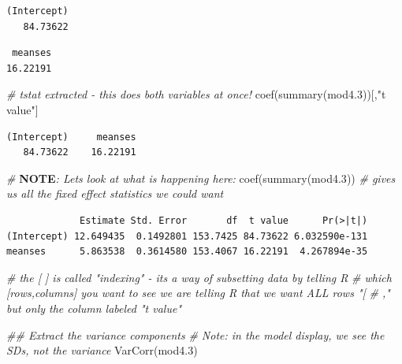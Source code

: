 \documentclass[
  letterpaper,
  DIV=11,
  numbers=noendperiod]{scrreprt}
\newenvironment{Shaded}{\begin{snugshade}}{\end{snugshade}}
\newcommand{\AlertTok}[1]{\textcolor[rgb]{1.00,0.00,0.00}{\textbf{#1}}}
\newcommand{\CommentTok}[1]{\textcolor[rgb]{0.38,0.63,0.69}{\textit{#1}}}
\newcommand{\DecValTok}[1]{\textcolor[rgb]{0.25,0.63,0.44}{#1}}
\newcommand{\DocumentationTok}[1]{\textcolor[rgb]{0.73,0.13,0.13}{\textit{#1}}}
\newcommand{\FloatTok}[1]{\textcolor[rgb]{0.25,0.63,0.44}{#1}}
\newcommand{\FunctionTok}[1]{\textcolor[rgb]{0.02,0.16,0.49}{#1}}
\newcommand{\NormalTok}[1]{\textcolor[rgb]{0.00,0.44,0.13}{#1}}
\newcommand{\SpecialCharTok}[1]{\textcolor[rgb]{0.25,0.44,0.63}{#1}}
\newcommand{\StringTok}[1]{\textcolor[rgb]{0.25,0.44,0.63}{#1}}
\begin{document}
\begin{verbatim}
(Intercept) 
   84.73622 
\end{verbatim}

\begin{Shaded}
\end{Shaded}

\begin{verbatim}
 meanses 
16.22191 
\end{verbatim}

\begin{Shaded}
\begin{Highlighting}[]
\CommentTok{\# tstat extracted {-} this does both variables at once! }
\FunctionTok{coef}\NormalTok{(}\FunctionTok{summary}\NormalTok{(mod4}\FloatTok{.3}\NormalTok{))[,}\StringTok{"t value"}\NormalTok{]}
\end{Highlighting}
\end{Shaded}

\begin{verbatim}
(Intercept)     meanses 
   84.73622    16.22191 
\end{verbatim}

\begin{Shaded}
\begin{Highlighting}[]
\CommentTok{\# }\AlertTok{NOTE}\CommentTok{: Let\textquotesingle{}s look at what is happening here:}
\FunctionTok{coef}\NormalTok{(}\FunctionTok{summary}\NormalTok{(mod4}\FloatTok{.3}\NormalTok{)) }\CommentTok{\# gives us all the fixed effect statistics we could want}
\end{Highlighting}
\end{Shaded}

\begin{verbatim}
             Estimate Std. Error       df  t value      Pr(>|t|)
(Intercept) 12.649435  0.1492801 153.7425 84.73622 6.032590e-131
meanses      5.863538  0.3614580 153.4067 16.22191  4.267894e-35
\end{verbatim}

\begin{Shaded}
\begin{Highlighting}[]
\CommentTok{\# the [ ] is called "indexing" {-} it\textquotesingle{}s a way of subsetting data by telling R}
\CommentTok{\# which [rows,columns] you want to see we are telling R that we want ALL rows "[}
\CommentTok{\# ," but only the column labeled "t value"}

\DocumentationTok{\#\# Extract the variance components}
\CommentTok{\# Note: in the model display, we see the SDs, not the variance}
\FunctionTok{VarCorr}\NormalTok{(mod4}\FloatTok{.3}\NormalTok{)}
\end{Highlighting}
\end{Shaded}
\end{document}

